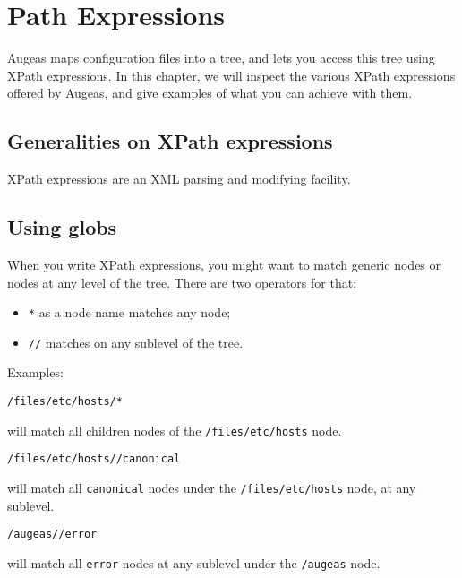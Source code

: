 \chapter{Path Expressions}

\label{chap:pathx}

 

Augeas maps configuration files into a tree, and lets you access this tree using XPath expressions. In this chapter, we will inspect the various XPath expressions offered by Augeas, and give examples of what you can achieve with them.

\section{Generalities on XPath expressions}

XPath expressions are an XML parsing and modifying facility.

\section{Using globs}

When you write XPath expressions, you might want to match generic nodes or nodes at any level of the tree. There are two operators for that:

\begin{itemize}
\item
  \verb!*! as a node name matches any node;
\item
  \nolinkurl{//} matches on any sublevel of the tree.
\end{itemize}
Examples:

\begin{verbatim}
/files/etc/hosts/*
\end{verbatim}
will match all children nodes of the \nolinkurl{/files/etc/hosts} node.

\begin{verbatim}
/files/etc/hosts//canonical
\end{verbatim}
will match all \verb!canonical! nodes under the \nolinkurl{/files/etc/hosts} node, at any sublevel.


\begin{verbatim}
/augeas//error
\end{verbatim}
will match all \verb!error! nodes at any sublevel under the \nolinkurl{/augeas} node.

